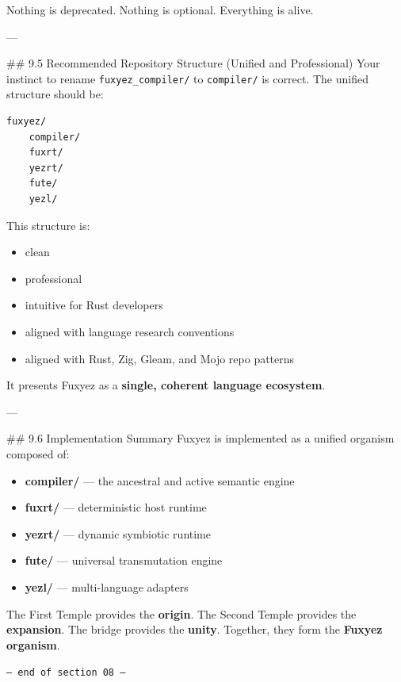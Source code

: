 \begin{enumerate}
\begin{lstlisting}[language=fuxyez]
\end{lstlisting}

Nothing is deprecated.  
Nothing is optional.  
Everything is alive.

---

\#\# 9.5 Recommended Repository Structure (Unified and Professional)  
Your instinct to rename \texttt{fuxyez_compiler/} to \texttt{compiler/} is correct.  
The unified structure should be:

\begin{lstlisting}[language=fuxyez]
fuxyez/
    compiler/
    fuxrt/
    yezrt/
    fute/
    yezl/

\end{lstlisting}

This structure is:

\begin{itemize}
  \item clean  
  \item professional  
  \item intuitive for Rust developers  
  \item aligned with language research conventions  
  \item aligned with Rust, Zig, Gleam, and Mojo repo patterns  
\end{itemize}

It presents Fuxyez as a \textbf{single, coherent language ecosystem}.

---

\#\# 9.6 Implementation Summary  
Fuxyez is implemented as a unified organism composed of:

\begin{itemize}
  \item \textbf{compiler/} — the ancestral and active semantic engine  
  \item \textbf{fuxrt/} — deterministic host runtime  
  \item \textbf{yezrt/} — dynamic symbiotic runtime  
  \item \textbf{fute/} — universal transmutation engine  
  \item \textbf{yezl/} — multi-language adapters  
\end{itemize}

The First Temple provides the \textbf{origin}.  
The Second Temple provides the \textbf{expansion}.  
The bridge provides the \textbf{unity}.  
Together, they form the \textbf{Fuxyez organism}.
    
    \vspace{1cm}
    \begin{center}
    \color{alienPurple}\texttt{--- end of section 08 ---}
    \end{center}
    \clearpage
    


\end{enumerate}
